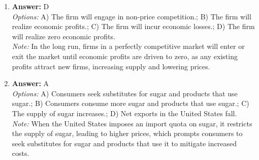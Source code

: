 \documentclass[12pt]{article}
\begin{document}
\begin{enumerate}[label=\arabic*.]
\item \textbf{Answer:} D
\\ \textit{Options:} A) The firm will engage in non-price competition.; B) The firm will realize economic profits.; C) The firm will incur economic losses.; D) The firm will realize zero economic profits.
\\ \textit{Note:} In the long run, firms in a perfectly competitive market will enter or exit the market until economic profits are driven to zero, as any existing profits attract new firms, increasing supply and lowering prices.
\item \textbf{Answer:} A
\\ \textit{Options:} A) Consumers seek substitutes for sugar and products that use sugar.; B) Consumers consume more sugar and products that use sugar.; C) The supply of sugar increases.; D) Net exports in the United States fall.
\\ \textit{Note:} When the United States imposes an import quota on sugar, it restricts the supply of sugar, leading to higher prices, which prompts consumers to seek substitutes for sugar and products that use it to mitigate increased costs.
\end{enumerate}
\end{document}
